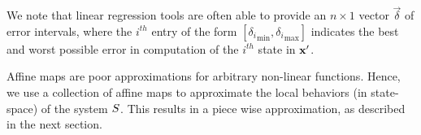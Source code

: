 
We note that linear regression tools are often able to provide an
$n\times 1$ vector $\vec{\delta}$ of error intervals, where the
$i^{th}$ entry of the form $[{\delta_i}_{\min},{\delta_i}_{\max}]$
indicates the best and worst possible error in computation of the
$i^{th}$ state in $\mathbf{x}'$.


Affine maps are poor approximations for arbitrary non-linear
functions. Hence, we use a collection of affine maps to approximate
the local behaviors (in state-space) of the system $S$. This
results in a piece wise approximation, as described in the next
section.






